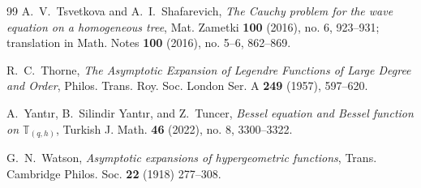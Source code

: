 \documentclass[12pt]{amsart}
\numberwithin{equation}{section}
\begin{document}
\begin{thebibliography}{99}
 A.~V.~Tsvetkova and A.~I.~Shafarevich, \emph{The Cauchy
problem for the wave equation on a homogeneous tree}, Mat. Zametki \textbf{%
100} (2016), no. 6, 923--931; translation in Math. Notes \textbf{100}
(2016), no. 5--6, 862--869.

 R.~C.~Thorne, \emph{The Asymptotic Expansion of Legendre
Functions of Large Degree and Order}, Philos. Trans. Roy. Soc. London Ser. A
\textbf{249} (1957), 597--620.

 A.~Yant{\i}r, B.~Silindir Yant{\i}r, and Z.~Tuncer, \emph{%
Bessel equation and Bessel function on $\mathbb{T}_{(q,h)}$}, Turkish J.
Math. \textbf{46} (2022), no. 8, 3300--3322.

 G.~N.~Watson, \emph{Asymptotic expansions of hypergeometric
functions}, Trans. Cambridge Philos. Soc. \textbf{22} (1918) 277--308.
\end{thebibliography}
\end{document}
